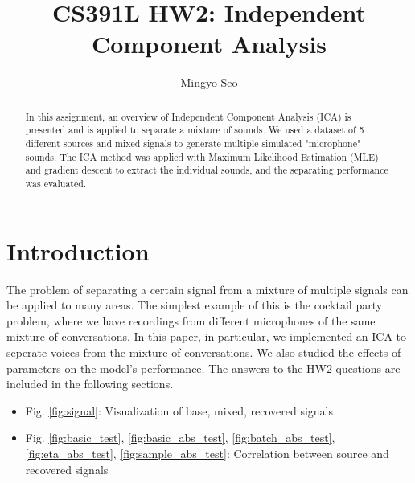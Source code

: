 \documentclass[conference]{IEEEtran}
\begin{document}
\title{CS391L HW2: Independent Component Analysis}

\author{Mingyo Seo}

\author{
}



\maketitle

\IEEEpeerreviewmaketitle

\begin{abstract}
In this assignment, an overview of Independent Component Analysis (ICA) is presented and is applied to separate a mixture of sounds. We used a dataset of 5 different sources and mixed signals to generate multiple simulated "microphone" sounds. The ICA method was applied with Maximum Likelihood Estimation (MLE) and gradient descent to extract the individual sounds, and the separating performance was evaluated.
\end{abstract}

\section{Introduction} %

The problem of separating a certain signal from a mixture of multiple signals can be applied to many areas. The simplest example of this is the cocktail party problem, where we have recordings from different microphones of the same mixture of conversations.
In this paper, in particular, we implemented an ICA to seperate voices from the mixture of conversations. 
We also studied the effects of parameters on the model's performance. The answers to the HW2 questions are included in the following sections.\begin{itemize}
\item Fig. \ref{fig:signal}: Visualization of base, mixed, recovered signals
\item Fig. \ref{fig:basic_test}, \ref{fig:basic_abs_test}, \ref{fig:batch_abs_test}, \ref{fig:eta_abs_test}, \ref{fig:sample_abs_test}: Correlation between source and recovered signals
\end{itemize}
\end{document}
